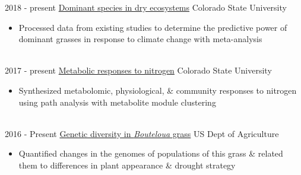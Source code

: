 \documentclass[letterpaper]{twentysecondcv} %
\begin{document}
\begin{twenty} %
    \twentyitem
   		{2018 -}
		{present}
        {\href{https://github.com/avahoffman/dryland-dominance}{Dominant species in dry ecosystems}}
       	{Colorado State University}
        {}
        {
        {\begin{itemize}
        \item Processed data from existing studies to determine the predictive power of dominant grasses in response to climate change with meta-analysis
    \end{itemize}}
        }
     \\
\twentyitem
   		{2017 -}
		{present}
        {\href{https://github.com/avahoffman/change-metabolomics}{Metabolic responses to nitrogen}}
       	{Colorado State University}
        {}
        {
        {\begin{itemize}
        \item Synthesized metabolomic, physiological, \& community responses to nitrogen using path analysis with metabolite module clustering
    \end{itemize}}
        }
     \\
\twentyitem
    	{2016 -}
		{Present}
        {\href{}{Genetic diversity in \textit{Bouteloua} grass}}
        {US Dept of Agriculture}
        {}
        {\begin{itemize}
        \item Quantified changes in the genomes of populations of this grass \& related them to differences in plant appearance \& drought strategy
        \end{itemize}}
        \\
        

\end{twenty}
\end{document}
